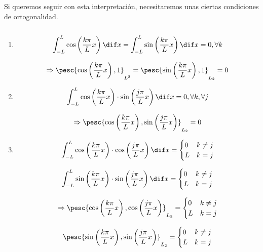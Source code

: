 		Si queremos seguir con esta interpretación, necesitaremos unas ciertas condiciones de ortogonalidad.

		\begin{theorem} $ $ %

			\begin{enumerate}[label=(\arabic*)]

				\item
				\[ \int^{L}_{-L} \cos \left( \frac{k \pi}{L} x \right) \dif x = \int^{L}_{-L} \sin \left( \frac{k \pi}{L} x \right) \dif x = 0, \forall k \]

				\[\Rightarrow \pesc{\cos \left( \frac{k \pi}{L} x \right),1}_{L^2} = \pesc{\sin \left( \frac{k \pi}{L} x \right),1}_{L_2} = 0\]

				\item
				\[ \int^{L}_{-L} \cos \left( \frac{k \pi}{L} x \right) \cdot \sin \left( \frac{j \pi}{L} x \right) \dif x = 0, \forall k, \forall j\]

				\[\Rightarrow \pesc{\cos \left( \frac{k \pi}{L} x \right), \sin \left( \frac{j \pi}{L} x \right) }_{L_2} = 0   \]

				\item
				\[ \int^{L}_{-L} \cos \left( \frac{k \pi}{L} x \right) \cdot \cos \left( \frac{j \pi}{L} x \right) \dif x = \begin{cases}
				0 & k \neq j \\
				L & k = j \end{cases} \]

				\[ \int^{L}_{-L} \sin \left( \frac{k \pi}{L} x \right) \cdot \sin \left( \frac{j \pi}{L} x \right) \dif x = \begin{cases}
				0 & k \neq j \\
				L & k = j \end{cases} \]

				\[\Rightarrow \pesc{\cos \left( \frac{k \pi}{L} x \right), \cos \left( \frac{j \pi}{L} x \right) }_{L_2} = \begin{cases}
				0 & k \neq j \\
				L & k = j \end{cases} \]

				\[ \pesc{\sin \left( \frac{k \pi}{L} x \right), \sin \left( \frac{j \pi}{L} x \right) }_{L_2} = \begin{cases}
				0 & k \neq j \\
				L & k = j \end{cases} \]

			\end{enumerate}
		\end{theorem}

